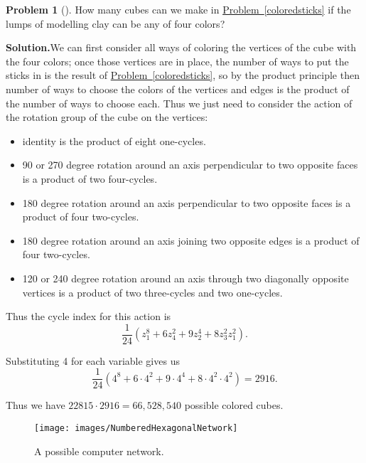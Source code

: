\documentclass[10pt,]{book}
\theoremstyle{plain}
\theoremstyle{definition}
\newtheorem{activity}[project]{Problem}
\theoremstyle{definition}
\numberwithin{equation}{chapter}
\begin{document}
\begin{activity}[]\label{activity-325}
How many cubes can we make in \hyperref[coloredsticks]{Problem~\ref{coloredsticks}} if the lumps of modelling clay can be any of four colors?%
\par\medskip\noindent%
\textbf{Solution.}\quad We can first consider all ways of coloring the vertices of the cube with the four colors; once those vertices are in place, the number of ways to put the sticks in is the result of \hyperref[coloredsticks]{Problem~\ref{coloredsticks}}, so by the product principle then number of ways to choose the colors of the vertices and edges is the product of the number of ways to choose each. Thus we just need to consider the action of the rotation group of the cube on the vertices: \leavevmode%
\begin{itemize}[label=\textbullet]
\item{}identity is the product of eight one-cycles.%
\item{}90 or 270 degree rotation around an axis perpendicular to two opposite faces is a product of two four-cycles.%
\item{}180 degree rotation around an axis perpendicular to two opposite faces is a product of four two-cycles.%
\item{}180 degree rotation around an axis joining two opposite edges is a product of four two-cycles.%
\item{}120 or 240 degree rotation around an axis through two diagonally opposite vertices is a product of two three-cycles and two one-cycles.%
\end{itemize}
 Thus the cycle index for this action is%
\begin{equation*}
\frac{1}{24}\left(z_1^8+6z_4^2 + 9z_2^4 + 8z_3^2z_1^2\right).
\end{equation*}
%
\par
Substituting 4 for each variable gives us%
\begin{equation*}
\frac{1}{24}\left(4^8+6\cdot4^2 +9\cdot 4^4 + 8\cdot4^2\cdot4^2\right)=2916.
\end{equation*}
%
\par
Thus we have \(22815\cdot2916=66,528,540\) possible colored cubes.%
\end{activity}
\begin{figure}
\centering
\texttt{[image: images/NumberedHexagonalNetwork]}
\caption{A possible computer network.\label{HexNet}}
\end{figure}
\end{document}
